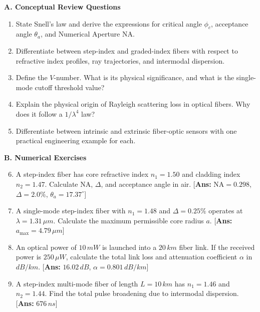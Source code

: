 \begin{practiceset}
\textbf{A. Conceptual Review Questions}
\begin{enumerate}
    \item State Snell's law and derive the expressions for critical angle $\phi_c$, acceptance angle $\theta_a$, and Numerical Aperture $\text{NA}$.
    \item Differentiate between step-index and graded-index fibers with respect to refractive index profiles, ray trajectories, and intermodal dispersion.
    \item Define the $V$-number. What is its physical significance, and what is the single-mode cutoff threshold value?
    \item Explain the physical origin of Rayleigh scattering loss in optical fibers. Why does it follow a $1/\lambda^4$ law?
    \item Differentiate between intrinsic and extrinsic fiber-optic sensors with one practical engineering example for each.
\end{enumerate}

\textbf{B. Numerical Exercises}
\begin{enumerate}
    \setcounter{enumi}{5}
    \item A step-index fiber has core refractive index $n_1 = 1.50$ and cladding index $n_2 = 1.47$. Calculate $\text{NA}$, $\Delta$, and acceptance angle in air. \hfill [\textbf{Ans:} $\text{NA} = 0.298$, $\Delta = 2.0\%$, $\theta_a = 17.37^\circ$]
    \item A single-mode step-index fiber with $n_1 = 1.48$ and $\Delta = 0.25\%$ operates at $\lambda = 1.31\,\si{\mu m}$. Calculate the maximum permissible core radius $a$. \hfill [\textbf{Ans:} $a_{\text{max}} = 4.79\,\si{\mu m}$]
    \item An optical power of $10\,\si{mW}$ is launched into a $20\,\si{km}$ fiber link. If the received power is $250\,\si{\mu W}$, calculate the total link loss and attenuation coefficient $\alpha$ in $\si{dB/km}$. \hfill [\textbf{Ans:} $16.02\,\si{dB}$, $\alpha = 0.801\,\si{dB/km}$]
    \item A step-index multi-mode fiber of length $L = 10\,\si{km}$ has $n_1 = 1.46$ and $n_2 = 1.44$. Find the total pulse broadening due to intermodal dispersion. \hfill [\textbf{Ans:} $676\,\si{ns}$]
\end{enumerate}
\end{practiceset}

